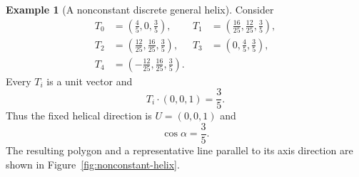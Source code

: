 \documentclass[10pt,a4paper]{amsart}
\theoremstyle{definition}
\newtheorem{example}[theorem]{Example}
\theoremstyle{remark}
\numberwithin{equation}{section}
\begin{document}
\begin{example}[A nonconstant discrete general helix]\label{ex:nonconstant-helix}
Consider
\[
\begin{aligned}
T_0&=\left(\frac45,0,\frac35\right),&
T_1&=\left(\frac{16}{25},\frac{12}{25},\frac35\right),\\
T_2&=\left(\frac{12}{25},\frac{16}{25},\frac35\right),&
T_3&=\left(0,\frac45,\frac35\right),\\
T_4&=\left(-\frac{12}{25},\frac{16}{25},\frac35\right).
\end{aligned}
\]
Every \(T_i\) is a unit vector and
\[
T_i\cdot(0,0,1)=\frac35.
\]
Thus the fixed helical direction is \(U=(0,0,1)\) and
\[
\cos\alpha=\frac35.
\]
The resulting polygon and a representative line parallel to its axis direction are shown in Figure~\ref{fig:nonconstant-helix}.


\end{example}
\end{document}
